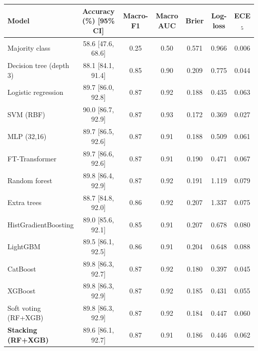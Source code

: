 \begin{tabular}{@{}lcccccc@{}}
\toprule
Model & Accuracy (\%) [95\% CI] & Macro-F1 & Macro AUC & Brier & Log-loss & ECE$_5$\\
\midrule
Majority class & 58.6 [47.6, 68.6] & 0.25 & 0.50 & 0.571 & 0.966 & 0.006\\\midrule
Decision tree (depth 3) & 88.1 [84.1, 91.4] & 0.85 & 0.90 & 0.209 & 0.775 & 0.044\\
Logistic regression & 89.7 [86.0, 92.8] & 0.87 & 0.92 & 0.188 & 0.435 & 0.063\\
SVM (RBF) & 90.0 [86.7, 92.9] & 0.87 & 0.93 & 0.172 & 0.369 & 0.027\\\midrule
MLP (32,16) & 89.7 [86.5, 92.6] & 0.87 & 0.91 & 0.188 & 0.509 & 0.061\\
FT-Transformer & 89.7 [86.6, 92.6] & 0.87 & 0.91 & 0.190 & 0.471 & 0.067\\
Random forest & 89.8 [86.4, 92.9] & 0.87 & 0.92 & 0.191 & 1.119 & 0.079\\
Extra trees & 88.7 [84.8, 92.0] & 0.86 & 0.92 & 0.207 & 1.337 & 0.075\\
HistGradientBoosting & 89.0 [85.6, 92.1] & 0.85 & 0.91 & 0.207 & 0.678 & 0.080\\
LightGBM & 89.5 [86.1, 92.5] & 0.86 & 0.91 & 0.204 & 0.648 & 0.088\\
CatBoost & 89.8 [86.3, 92.7] & 0.87 & 0.92 & 0.180 & 0.397 & 0.045\\\midrule
XGBoost & 89.8 [86.3, 92.9] & 0.87 & 0.92 & 0.185 & 0.431 & 0.055\\
Soft voting (RF+XGB) & 89.8 [86.3, 92.9] & 0.87 & 0.92 & 0.184 & 0.447 & 0.060\\
\textbf{Stacking (RF+XGB)} & 89.6 [86.1, 92.7] & 0.87 & 0.91 & 0.186 & 0.446 & 0.062\\
\bottomrule
\end{tabular}